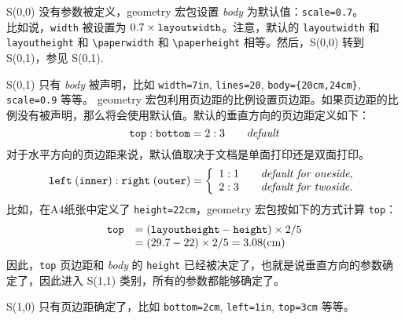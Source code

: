 \documentclass[titlepage]{ctexart}
\def\Gm{\textsf{geometry}}
\newcommand{\gpart}[1]{\textsf{\textsl{\color[rgb]{.0,.45,.7}#1}}}
\newenvironment{Spec}%
  {\begin{list}{}{%
   \renewcommand{\makelabel}[1]{\fbox{##1}\hfil}%
   \setlength{\itemsep}{-.5\parsep}
   \settowidth{\labelwidth}{\texttt{S(x,x)}}%
   \setlength{\leftmargin}{\labelwidth}%
   \addtolength{\leftmargin}{\labelsep}%
   \addtolength{\leftmargin}{2em}%
   \setlength{\rightmargin}{2em}}%
   \raggedright}
  {\end{list}}
\begin{document}
	 \begin{Spec}
	 \item[S(0,0)]
	 没有参数被定义，\Gm{} 宏包设置 \gpart{body} 为默认值：\verb|scale=0.7|。\\
	 比如说，\verb|width| 被设置为 $0.7\times \verb|layoutwidth|$。注意，默认的 \verb|layoutwidth| 和 \verb|layoutheight| 和 \verb|\paperwidth| 和 \verb|\paperheight| 相等。然后，S(0,0) 转到 S(0,1)，参见 S(0,1).
	 \bigskip
	 
	 \item[S(0,1)]
	 只有 \gpart{body} 被声明，比如 \verb|width=7in|, \verb|lines=20|, \verb|body={20cm,24cm}|, \verb|scale=0.9| 等等。
	 \Gm{} 宏包利用页边距的比例设置页边距。如果页边距的比例没有被声明，那么将会使用默认值。默认的垂直方向的页边距定义如下：
	 \begin{equation}
	 \verb|top| : \verb|bottom| = 2 : 3 \qquad\textit{default}
	 \end{equation}
	 对于水平方向的页边距来说，默认值取决于文档是单面打印还是双面打印。
	 \begin{equation}
	  \verb|left|\;(\verb|inner|) : \verb|right|\;(\verb|outer|) 
	       = \left\{ \begin{array}{ll}
	              1 : 1 \qquad\textit{default for oneside},\\
	              2 : 3 \qquad\textit{default for twoside}.
	         \end{array}\right.
	 \end{equation}
	 比如，在A4纸张中定义了 \verb|height=22cm|，\Gm{} 宏包按如下的方式计算 \verb|top|：
	 \begin{equation}
	 	\begin{array}{ll}
	 	\verb|top| &= ( \verb|layoutheight| - \verb|height| ) \times 2/5\\
	 	&= (29.7-22)\times 2/5 = 3.08\textrm{(cm)}
	 	\end{array}
	 \end{equation}
	 因此，\verb|top| 页边距和 \gpart{body} 的 \verb|height| 已经被决定了，也就是说垂直方向的参数确定了，因此进入 S(1,1) 类别，所有的参数都能够确定了。
	 \bigskip
	 
	 \item[S(1,0)]
	 只有页边距确定了，比如 \verb|bottom=2cm|, \verb|left=1in|, \verb|top=3cm| 等等。
	 

\end{Spec}
\end{document}
